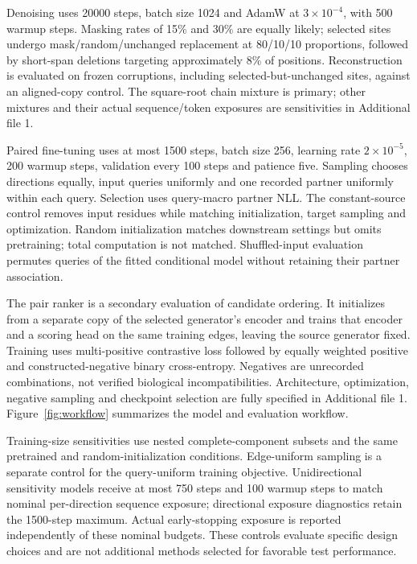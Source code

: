 \documentclass[a4paper,11pt]{article}
\begin{document}
Denoising uses 20000 steps, batch size 1024 and AdamW at
$3\times10^{-4}$, with 500 warmup steps. Masking rates of 15\% and 30\%
are equally likely; selected sites undergo mask/random/unchanged replacement
at 80/10/10 proportions, followed by short-span deletions targeting
approximately 8\% of positions. Reconstruction is evaluated on frozen
corruptions, including selected-but-unchanged sites, against an aligned-copy
control. The square-root chain mixture is primary; other mixtures and their
actual sequence/token exposures are sensitivities in Additional file 1.

Paired fine-tuning uses at most 1500 steps, batch size 256, learning rate
$2\times10^{-5}$, 200 warmup steps, validation every 100 steps and patience
five. Sampling chooses directions equally, input queries uniformly and one
recorded partner uniformly within each query. Selection uses query-macro
partner NLL. The constant-source control removes input residues while
matching initialization, target sampling and optimization. Random initialization
matches downstream settings but omits pretraining; total computation is not
matched. Shuffled-input evaluation permutes queries of the fitted conditional
model without retaining their partner association.

The pair ranker is a secondary evaluation of candidate ordering.
It initializes from a separate copy of the selected generator's encoder and
trains that encoder and a scoring head on the same training edges, leaving
the source generator fixed. Training uses multi-positive contrastive loss
followed by equally weighted positive and constructed-negative binary
cross-entropy. Negatives are unrecorded combinations, not verified biological
incompatibilities. Architecture, optimization, negative sampling and checkpoint
selection are fully specified in Additional file 1.
Figure~\ref{fig:workflow} summarizes the model and evaluation workflow.

Training-size sensitivities use nested complete-component subsets and the
same pretrained and random-initialization conditions. Edge-uniform sampling
is a separate control for the query-uniform training objective.
Unidirectional sensitivity models receive at most 750 steps and 100 warmup
steps to match nominal per-direction sequence exposure; directional exposure
diagnostics retain the 1500-step maximum. Actual early-stopping exposure is
reported independently of these nominal budgets. These controls evaluate
specific design choices and are not additional methods selected for favorable
test performance.
\end{document}
